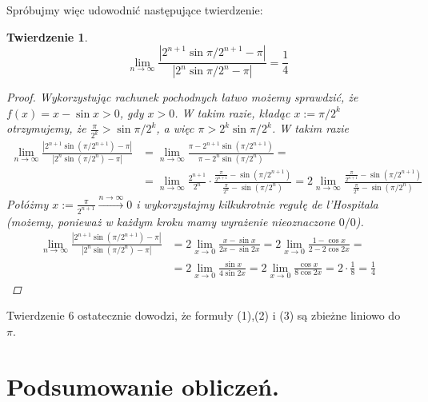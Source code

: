 \documentclass[10pt,wide]{mwart}
\newtheorem{tw}{Twierdzenie}
\theoremstyle{definition}
\begin{document}
Spróbujmy więc udowodnić następujące twierdzenie:
\begin{tw}
  \begin{equation*}
    \lim_{n\to\infty} \frac{|2^{n+1}\sin{\pi/2^{n+1}} - \pi|}{|2^{n}\sin{\pi/2^{n}} - \pi|} = \frac{1}{4}
  \end{equation*}
  \begin{proof}
    Wykorzystując rachunek pochodnych łatwo możemy sprawdzić, że \(f(x) = x - \sin{x} > 0\), gdy \(x > 0\). W takim razie, kładąc \(x:= \pi/2^k\) otrzymujemy, że \(\frac{\pi}{2^k} > \sin{\pi/2^k} \), a więc \(\pi > 2^k\sin{\pi/2^k} \).
    W takim razie
    \begin{equation*}
      \begin{split}
        \lim_{n\to\infty} \frac{|2^{n+1}\sin{(\pi/2^{n+1})} - \pi|}{|2^{n}\sin{(\pi/2^{n})} - \pi|} & = \lim_{n\to\infty} \frac{\pi - 2^{n+1}\sin{(\pi/2^{n+1})}}{\pi - 2^{n}\sin{(\pi/2^{n})}} = \\
         & = \lim_{n\to\infty} \frac{2^{n+1}}{2^{n}}\cdot\frac{\frac{\pi}{2^{n+1}} - \sin{(\pi/2^{n+1})}}{\frac{\pi}{2^{n}} - \sin{(\pi/2^{n})}} = 2 \lim_{n\to\infty} \frac{\frac{\pi}{2^{n+1}} - \sin{(\pi/2^{n+1})}}{\frac{\pi}{2^{n}} - \sin{(\pi/2^{n})}}
      \end{split}
    \end{equation*}
    Połóżmy \(x:= \frac{\pi}{2^{n+1}} \stackrel{n\to\infty}{\to} 0\) i wykorzystajmy kilkukrotnie regułę de l'Hospitala (możemy, ponieważ w każdym kroku mamy wyrażenie nieoznaczone \(0/0\)).
    \begin{equation*}
      \begin{split}
        \lim_{n\to\infty} \frac{|2^{n+1}\sin{(\pi/2^{n+1})} - \pi|}{|2^{n}\sin{(\pi/2^{n})} - \pi|} & = 2 \lim_{x\to0} \frac{x - \sin{x}}{2x - \sin{2x}} =
         2 \lim_{x\to0} \frac{1 - \cos{x}}{2 - 2\cos{2x}} = \\ & =  2 \lim_{x\to0} \frac{\sin{x}}{4\sin{2x}}
         = 2 \lim_{x\to0} \frac{\cos{x}}{8\cos{2x}} = 2\cdot \frac{1}{8} = \frac{1}{4}
      \end{split}
    \end{equation*}
  \end{proof}
\end{tw}
  Twierdzenie 6 ostatecznie dowodzi, że formuły (1),(2) i (3) są zbieżne liniowo do \(\pi\).



\section{Podsumowanie obliczeń.}
\end{document}

